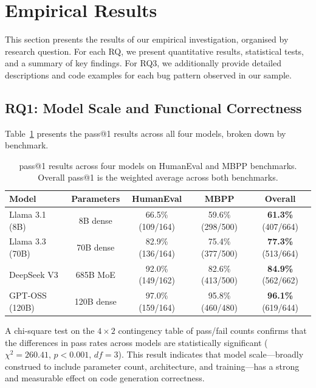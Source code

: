 \documentclass[smallextended]{svjour3}
\begin{document}
\section{Empirical Results}
\label{sec:results}

This section presents the results of our empirical investigation, organised by research question. For each RQ, we present quantitative results, statistical tests, and a summary of key findings. For RQ3, we additionally provide detailed descriptions and code examples for each bug pattern observed in our sample.

\subsection{RQ1: Model Scale and Functional Correctness}
\label{sec:rq1}

Table~\ref{tab:pass_results} presents the pass@1 results across all four models, broken down by benchmark.

\begin{table}[t]
\centering
\caption{pass@1 results across four models on HumanEval and MBPP benchmarks. Overall pass@1 is the weighted average across both benchmarks.}
\label{tab:pass_results}
\begin{tabular}{lcccc}
\toprule
Model & Parameters & HumanEval & MBPP & Overall \\
\midrule
Llama 3.1 (8B) & 8B dense & 66.5\% (109/164) & 59.6\% (298/500) & \textbf{61.3\%} (407/664) \\
Llama 3.3 (70B) & 70B dense & 82.9\% (136/164) & 75.4\% (377/500) & \textbf{77.3\%} (513/664) \\
DeepSeek V3 & 685B MoE & 92.0\% (149/162) & 82.6\% (413/500) & \textbf{84.9\%} (562/662) \\
GPT-OSS (120B) & 120B dense & 97.0\% (159/164) & 95.8\% (460/480) & \textbf{96.1\%} (619/644) \\
\bottomrule
\end{tabular}
\end{table}

A chi-square test on the $4 \times 2$ contingency table of pass/fail counts confirms that the differences in pass rates across models are statistically significant ($\chi^2 = 260.41$, $p < 0.001$, $df = 3$). This result indicates that model scale---broadly construed to include parameter count, architecture, and training---has a strong and measurable effect on code generation correctness.
\end{document}
